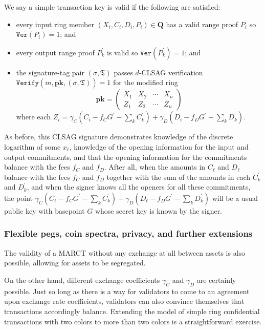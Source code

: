 \documentclass{mrl}
\theoremstyle{plain}
\theoremstyle{definition}
\begin{document}
We say a simple transaction key is valid if the following are satisfied:
\begin{itemize}
\item every input ring member $(X_i, C_i, D_i, P_i) \in \textbf{Q}$ has a valid range proof $P_i$ so $\texttt{Ver}(P_i) = 1$; and
\item every output range proof $P_k^\prime$ is valid so $\texttt{Ver}(P_k^\prime)=1$; and
\item the signature-tag pair $(\sigma, \mathfrak{T})$ passes $d$-CLSAG verification $\texttt{Verify}(m, \underline{\textbf{pk}}, (\sigma, \mathfrak{T})) = 1$ for the modified ring \[\textbf{pk} = \begin{pmatrix} X_1 & X_2 & \cdots & X_n \\ Z_1 & Z_2 & \cdots & Z_n\end{pmatrix}\] where each $Z_i = \gamma_C (C_i - f_C G^\prime - \sum_k C_k^\prime) + \gamma_D ( D_i - f_D G^\prime - \sum_k D_k^\prime)$.
\end{itemize}

As before, this CLSAG signature demonstrates knowledge of the discrete logarithm of some $x_\ell$, knowledge of the opening information for the input and output commitments, and that the opening information for the commitments balance with the fees $f_C$ and $f_D$.  After all, when the amounts in $C_\ell$ and $D_\ell$ balance with the fees $f_C$ and $f_D$ together with the sum of the amounts in each $C_k^\prime$ and $D_k^\prime$, and when the signer knows all the openers for all these commitments, the point $\gamma_C(C_\ell - f_C G^\prime - \sum_k C_k^\prime) + \gamma_D(D_\ell - f_D G^\prime - \sum_k D_k^\prime)$ will be a usual public key with basepoint $G$ whose secret key is known by the signer.


\subsubsection{Flexible pegs, coin spectra, privacy, and further extensions}

The validity of a MARCT without any exchange at all between assets is also possible, allowing for assets to be segregated. 

On the other hand, different exchange coefficients $\gamma_C$ and $\gamma_D$ are certainly possible.  Just so long as there is a way for validators to come to an agreement upon exchange rate coefficients, validators can also convince themselves that transactions accordingly balance. Extending the model of simple ring confidential transactions with two colors to more than two colors is a straightforward exercise.
\end{document}
